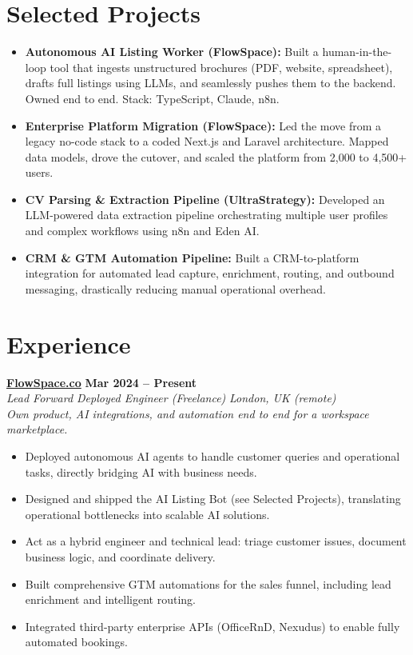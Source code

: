 \documentclass[a4paper,10pt]{article}
\newcommand{\role}[4]{%
 \textbf{#1} \hfill \textbf{#2}\\[1pt]%
 \textit{#3} \hfill \textit{#4}\\[2pt]%
}
\begin{document}
\section{Selected Projects}
\begin{itemize}
 \item \textbf{Autonomous AI Listing Worker (FlowSpace):} Built a human-in-the-loop tool that ingests unstructured brochures (PDF, website, spreadsheet), drafts full listings using LLMs, and seamlessly pushes them to the backend. Owned end to end. Stack: TypeScript, Claude, n8n.
 \item \textbf{Enterprise Platform Migration (FlowSpace):} Led the move from a legacy no-code stack to a coded Next.js and Laravel architecture. Mapped data models, drove the cutover, and scaled the platform from 2,000 to 4,500+ users.
 \item \textbf{CV Parsing \& Extraction Pipeline (UltraStrategy):} Developed an LLM-powered data extraction pipeline orchestrating multiple user profiles and complex workflows using n8n and Eden AI.
 \item \textbf{CRM \& GTM Automation Pipeline:} Built a CRM-to-platform integration for automated lead capture, enrichment, routing, and outbound messaging, drastically reducing manual operational overhead.
\end{itemize}

\section{Experience}

\role{\href{https://flowspace.co}{FlowSpace.co}}{Mar 2024 -- Present}{Lead Forward Deployed Engineer (Freelance)}{London, UK (remote)}
\textit{Own product, AI integrations, and automation end to end for a workspace marketplace.}
\begin{itemize}
 \item Deployed autonomous AI agents to handle customer queries and operational tasks, directly bridging AI with business needs.
 \item Designed and shipped the AI Listing Bot (see Selected Projects), translating operational bottlenecks into scalable AI solutions.
 \item Act as a hybrid engineer and technical lead: triage customer issues, document business logic, and coordinate delivery.
 \item Built comprehensive GTM automations for the sales funnel, including lead enrichment and intelligent routing.
 \item Integrated third-party enterprise APIs (OfficeRnD, Nexudus) to enable fully automated bookings.
\end{itemize}
\end{document}
